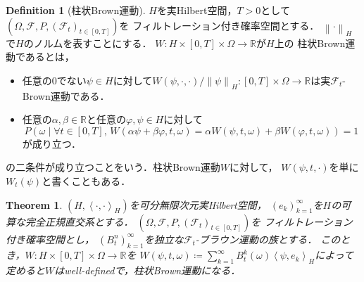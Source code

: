 \documentclass[dvipdfmx,autodetect-engine]{jsarticle}
\newtheorem{theorem}{Theorem}[section]
\theoremstyle{remark}
\theoremstyle{definition}
\newtheorem{definition}{Definition}[section]
\newcommand{\R}{\mathbb{R}}
\newcommand{\norm}[1]{\left\lVert#1\right\rVert}
\newcommand{\setmid}{\mathrel{} \middle| \mathrel{}}
\newcommand{\paren}[1]{\left( #1 \right)}
\newcommand{\iprod}[1]{\left\langle #1 \right\rangle}
\begin{document}
\begin{definition}[柱状Brown運動]
$H$を実Hilbert空間，$T>0$として
$(\Omega,\mathcal{F},P,(\mathcal{F}_{t})_{t\in [0,T]})$を
フィルトレーション付き確率空間とする．
$\norm{\cdot}_{H}$で$H$のノルムを表すことにする．
$W \colon H  \times [0,T] \times \Omega \to \R$が$H$上の
柱状Brown運動であるとは，
\begin{itemize}
    \item 任意の$0$でない$\psi \in H$に対して$W(\psi,\cdot,\cdot) / \norm{\psi}_{H}
    \colon [0,T]\times\Omega  \to \R$は実$\mathcal{F}_{t}$-Brown運動である．
    \item 任意の$\alpha,\beta \in \R$と任意の$\varphi,\psi \in H$に対して
    \begin{equation}
        P\paren{\omega \setmid \forall t \in [0,T],\,
        W(\alpha\psi + \beta\varphi,t,\omega) = 
    \alpha W(\psi,t,\omega) + \beta W(\varphi, t, \omega)} =1
    \end{equation}
    が成り立つ．
\end{itemize}
の二条件が成り立つことをいう．柱状Brown運動$W$に対して，
$W(\psi,t,\cdot)$を単に$W_{t}(\psi)$と書くこともある．
\end{definition}


\begin{theorem}
    $(H,\iprod{\cdot,\cdot}_{H})$を可分無限次元実Hilbert空間，
    $(e_{k})_{k=1}^{\infty}$を$H$の可算な完全正規直交系とする．
    $(\Omega,\mathcal{F},P,(\mathcal{F}_{t})_{t\in [0,T]})$を
    フィルトレーション付き確率空間とし，
    $(B_{t}^{n})_{k=1}^{\infty}$を独立な$\mathcal{F}_{t}$-ブラウン運動の族とする．
    このとき，$W \colon H \times [0,T]\times \Omega  \to \R$を
    $W(\psi,t,\omega) \coloneqq \sum_{k=1}^{\infty} B_{t}^{k}(\omega) \iprod{
    \psi, e_{k}}_{H}$によって定めると$W$はwell-definedで，柱状Brown運動になる．
\end{theorem}
\end{document}
